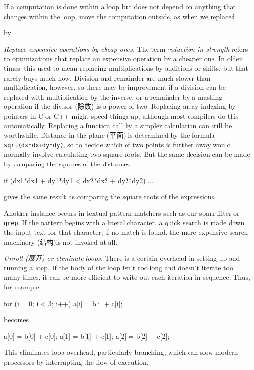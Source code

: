If a computation is done within a loop but does not depend on anything that
changes within the loop, move the computation outside, as when we replaced
\begin{wellcode}
    for (i = 0; i < nstarting[c]; i++) {
\end{wellcode}
by
\begin{wellcode}
    n = nstarting[c];
    for (i = 0; i < n; i++) {
\end{wellcode}

\emph{Replace expensive operations by cheap ones.} The term
\textit{reduction in strength} refers to optimizations that replace an
expensive operation by a cheaper one. In olden times, this used to mean
replacing multiplications by additions or shifts, but that rarely buys much
now. Division and remainder are much slower than multiplication, however,
so there may be improvement if a division can be replaced with
multiplication by the inverse, or a remainder by a masking operation if the
divisor (除数) is a power of two.  Replacing array indexing by pointers in
C or C++ might speed things up, although most compilers do this
automatically. Replacing a function call by a simpler calculation can still
be worthwhile. Distance in the plane (平面) is determined by the formula
\verb'sqrt(dx*dx+dy*dy)', so to decide which of two points is further away
would normally involve calculating two square roots. But the same decision
can be made by comparing the squares of the distances:
\begin{wellcode}
    if (dx1*dx1 + dy1*dy1 < dx2*dx2 + dy2*dy2)
        ...
\end{wellcode}
gives the same result as comparing the square roots of the expressions.

Another instance occurs in textual pattern matchers such as our spam filter
or \verb'grep'. If the pattern begins with a literal character, a quick
search is made down the input text for that character; if no match is
found, the more expensive search machinery (结构)is not invoked at all.

\emph{Unroll (展开) or eliminate loops.} There is a certain overhead in
setting up and running a loop. If the body of the loop isn't too long and
doesn't iterate too many times, it can be more efficient to write out each
iteration in sequence. Thus, for example:
\begin{wellcode}
    for (i = 0; i < 3; i++)
        a[i] = b[i] + c[i];
\end{wellcode}
becomes
\begin{wellcode}
    a[0] = b[0] + c[0];
    a[1] = b[1] + c[1];
    a[2] = b[2] + c[2];
\end{wellcode}
This eliminates loop overhead, particularly branching, which can slow
modern processors by interrupting the flow of execution.

